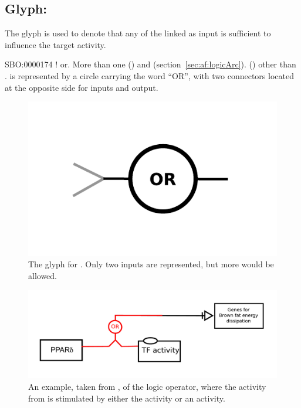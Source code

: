 \subsection{Glyph: }
\label{sec:af:or}

The glyph  is used to denote that any of the  linked as input is sufficient to influence the target activity.

\begin{glyphDescription}
 \glyphSboTerm SBO:0000174 ! or.
 \glyphOrigin More than one  () and  (section~\ref{sec:af:logicArc}).
 \glyphTarget  {} () other than .
 \glyphNode {} is represented by a circle carrying the word ``OR'', with two connectors located at the opposite side for inputs and output.
 \end{glyphDescription}

\begin{figure}[H]
  \centering
  \includegraphics[scale = 0.5]{images/or}
  \caption{The \AF glyph for . Only two inputs are represented, but more would be allowed.}
  \label{fig:af:or}
\end{figure}


\begin{figure}[H]
  \centering
  \includegraphics[scale = 0.5]{examples/ex-or}
  \caption{An example, taken from , of the  logic operator, where the activity from  is stimulated by either the  activity or an  activity.}
  \label{fig:af:ex-or}
\end{figure}
